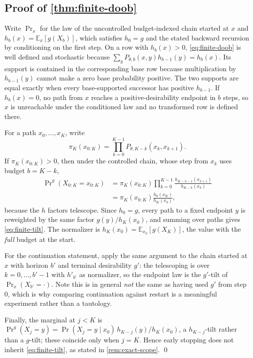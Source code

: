\documentclass{article}
\newcommand{\E}{\mathbb{E}}
\theoremstyle{definition}
\theoremstyle{remark}
\begin{document}
\subsection{Proof of \cref{thm:finite-doob}}

Write $\Pr_x$ for the law of the uncontrolled budget-indexed chain started at $x$ and $h_b(x)=\E_x[g(X_b)]$, which satisfies $h_0=g$ and the stated backward recursion by conditioning on the first step. On a row with $h_b(x)>0$, \eqref{eq:finite-doob} is well defined and stochastic because $\sum_yP_{\theta,b}(x,y)h_{b-1}(y)=h_b(x)$. Its support is contained in the corresponding base row because multiplication by $h_{b-1}(y)$ cannot make a zero base probability positive. The two supports are equal exactly when every base-supported successor has positive $h_{b-1}$. If $h_b(x)=0$, no path from $x$ reaches a positive-desirability endpoint in $b$ steps, so $x$ is unreachable under the conditioned law and no transformed row is defined there.

For a path $x_0,\dots,x_K$, write
\[
\pi_K(x_{0:K})=\prod_{k=0}^{K-1}P_{\theta,K-k}(x_k,x_{k+1}).
\]
If $\pi_K(x_{0:K})>0$, then under the controlled chain, whose step from $x_k$ uses budget $b=K-k$,
\[
\begin{aligned}
\Pr\nolimits^{g}(X_{0:K}=x_{0:K})
&=\pi_K(x_{0:K})\prod_{k=0}^{K-1}
\frac{h_{K-k-1}(x_{k+1})}{h_{K-k}(x_k)}\\
&=\pi_K(x_{0:K})\frac{h_0(x_K)}{h_K(x_0)},
\end{aligned}
\]
because the $h$ factors telescope. Since $h_0=g$, every path to a fixed endpoint $y$ is reweighted by the same factor $g(y)/h_K(x_0)$, and summing over paths gives \eqref{eq:finite-tilt}. The normalizer is $h_K(x_0)=\E_{x_0}[g(X_K)]$, the value with the \emph{full} budget at the start.

For the continuation statement, apply the same argument to the chain started at $x$ with horizon $b'$ and terminal desirability $g'$: the telescoping is over $k=0,\dots,b'-1$ with $h'_{b'}$ as normalizer, so the endpoint law is the $g'$-tilt of $\Pr_x(X_{b'}=\cdot)$. Note this is in general \emph{not} the same as having used $g'$ from step $0$, which is why comparing continuation against restart is a meaningful experiment rather than a tautology.

Finally, the marginal at $j<K$ is $\Pr^{g}(X_j=y)=\Pr(X_j=y\mid x_0)\,h_{K-j}(y)/h_K(x_0)$, a $h_{K-j}$-tilt rather than a $g$-tilt; these coincide only when $j=K$. Hence early stopping does not inherit \eqref{eq:finite-tilt}, as stated in \cref{rem:exact-scope}. \qed
\end{document}
